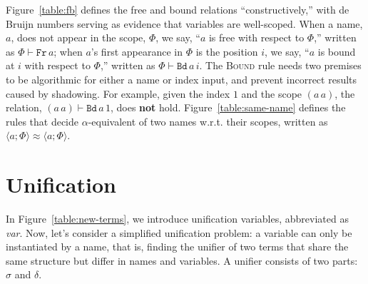 \documentclass[a4paper,UKenglish]{lipics-v2016}
\newcommand{\clos}[2] {
\langle #1; #2 \rangle
}
\newcommand{\aeq}[4] {
\clos{#1}{#2} \approx \clos{#3}{#4}
}
\newcommand*{\transname}[1]{\textsc{#1}}
\begin{document}
Figure~\ref{table:fb} defines the free and bound relations
``constructively,'' with de Bruijn numbers serving as
evidence that variables are well-scoped. When a name, $a$, does not
appear in the scope, $\Phi$, we say, ``$a$ is free with respect to
$\Phi$,'' written as $\Phi \vdash \texttt{Fr}\, a$; when $a$'s first
appearance in $\Phi$ is the position $i$, we say, ``$a$ is bound at
$i$ with respect to $\Phi$,'' written as $\Phi \vdash \texttt{Bd}\,
a\,i$. The \transname{Bound} rule needs two premises to be algorithmic
for either a name or index input,
and prevent incorrect results caused by shadowing.
For example, given the index $1$ and the scope $(a\,a)$,
the relation, $(a\,a) \vdash \texttt{Bd}\,a\,1$, does \textbf{not} hold.
Figure~\ref{table:same-name} defines the rules that decide
$\alpha$-equivalent of two names w.r.t. their scopes, written as
$\aeq{a}{\Phi}{a}{\Phi}$. 

\section{Unification}
\label{unify}
In Figure~\ref{table:new-terms}, we introduce unification variables,
abbreviated as \emph{var}. Now, let's consider a simplified
unification problem: a variable can only be instantiated by a name, that is,
finding the unifier of two terms that share the same structure but
differ in names and variables. A unifier consists of two parts:
$\sigma$ and $\delta$.
\end{document}
